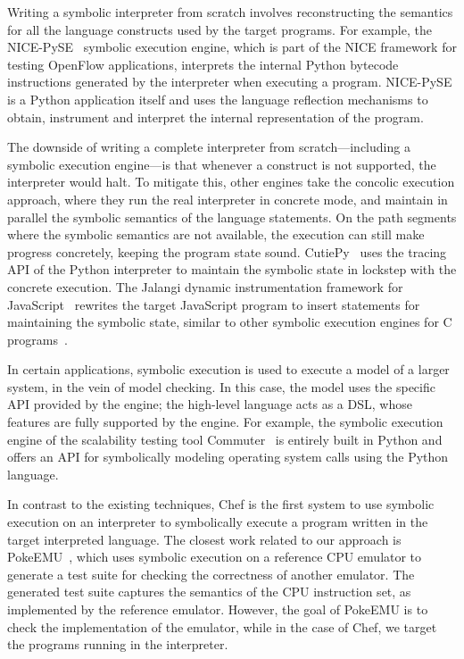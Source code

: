Writing a symbolic interpreter from scratch involves reconstructing the semantics for all the language constructs used by the target programs.  For example, the NICE-PySE~\cite{nice} symbolic execution engine, which is part of the NICE framework for testing OpenFlow applications, interprets the internal Python bytecode instructions generated by the interpreter when executing a program.  NICE-PySE is a Python application itself and uses the language reflection mechanisms to obtain, instrument and interpret the internal representation of the program.

The downside of writing a complete interpreter from scratch---including a symbolic execution engine---is that whenever a construct is not supported, the interpreter would halt.  To mitigate this, other engines take the concolic execution approach, where they run the real interpreter in concrete mode, and maintain in parallel the symbolic semantics of the language statements.  On the path segments where the symbolic semantics are not available, the execution can still make progress concretely, keeping the program state sound.  CutiePy~\cite{cutie-py} uses the tracing API of the Python interpreter to maintain the symbolic state in lockstep with the concrete execution.  The Jalangi dynamic instrumentation framework for JavaScript~\cite{jalangi} rewrites the target JavaScript program to insert statements for maintaining the symbolic state, similar to other symbolic execution engines for C programs~\cite{dart,cute,exe}.

In certain applications, symbolic execution is used to execute a model of a larger system, in the vein of model checking.  In this case, the model uses the specific API provided by the engine; the high-level language acts as a DSL, whose features are fully supported by the engine.
%
For example, the symbolic execution engine of the scalability testing tool Commuter~\cite{commuter} is entirely built in Python and offers an API for symbolically modeling operating system calls using the Python language.

In contrast to the existing techniques, Chef is the first system to use symbolic execution on an interpreter to symbolically execute a program written in the target interpreted language.  The closest work related to our approach is PokeEMU~\cite{hifi-lofi}, which uses symbolic execution on a reference CPU emulator to generate a test suite for checking the correctness of another emulator.  The generated test suite captures the semantics of the CPU instruction set, as implemented by the reference emulator.  However, the goal of PokeEMU is to check the implementation of the emulator, while in the case of Chef, we target the programs running in the interpreter.

